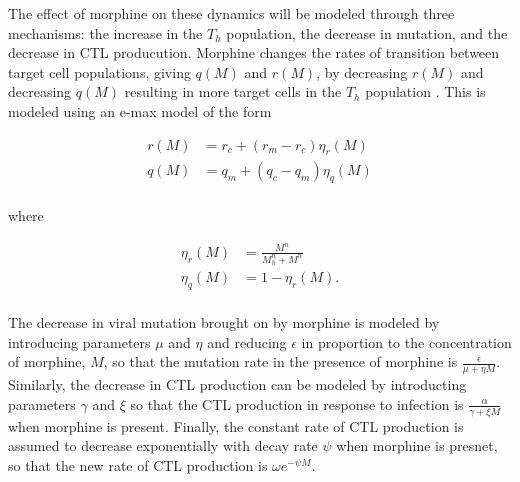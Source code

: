 \documentclass[11pt, oneside]{article}    %
\begin{document}
\vspace{5mm}

The effect of morphine on these dynamics will be modeled through three mechanisms: the increase in the $T_h$ population, the decrease in mutation, and the decrease in CTL producution. Morphine changes the rates of transition between target cell populations, giving $q(M)$ and $r(M)$, by decreasing $r(M)$ and decreasing $q(M)$ resulting in more target cells in the $T_h$ population \cite{Vaidya}. This is modeled using an e-max model of the form

\begin{align*}
r(M) &= r_c + (r_m - r_c) \eta_r(M)\\
q(M) &= q_m + (q_c - q_m) \eta_q (M)\\
\end{align*}

where 

\begin{align*}
\eta_r(M) &= \frac{M^n}{M_h^n + M^n}\\
\eta_q(M) &= 1- \eta_r(M).\\
\end{align*}

\vspace{5mm}

The decrease in viral mutation brought on by morphine is modeled by introducing parameters $\mu$ and $\eta$ and reducing $\epsilon$ in proportion to the concentration of morphine, $M$, so that the mutation rate in the presence of morphine is $\frac{\epsilon}{\mu + \eta M}$. Similarly, the decrease in CTL production can be modeled by introducting parameters $\gamma$ and $\xi$ so that the CTL production in response to infection is $\frac{\alpha}{\gamma + \xi M}$ when morphine is present. Finally, the constant rate of CTL production is assumed to decrease exponentially with decay rate $\psi$ when morphine is presnet, so that the new rate of CTL production is $\omega e^{-\psi M}$.


\end{document}
